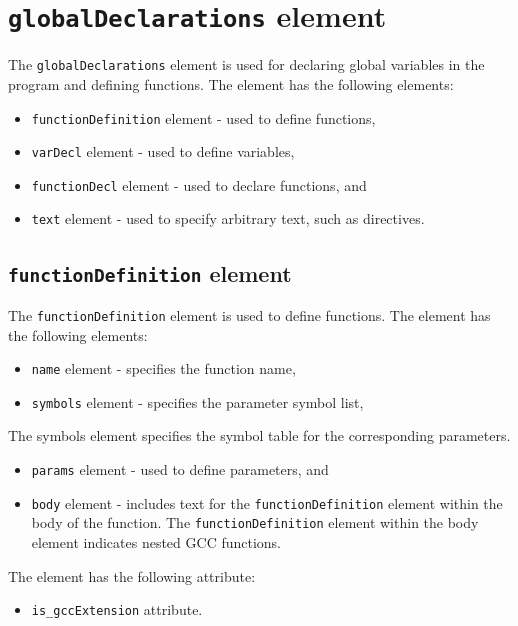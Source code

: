 \section{ {\tt globalDeclarations} element}

The {\tt globalDeclarations} element is used for declaring global variables in the program and defining functions. The element has the following elements:

\begin{itemize}
\item {\tt functionDefinition} element - used to define functions,
\item {\tt varDecl} element - used to define variables,
\item {\tt functionDecl} element - used to declare functions, and
\item {\tt text} element - used to specify arbitrary text, such as directives.
\end{itemize}


\subsection{ {\tt functionDefinition} element}

The {\tt functionDefinition} element is used to define functions. 
The element has the following elements:

\begin{itemize}
\item {\tt name} element - specifies the function name,
\item {\tt symbols} element - specifies the parameter symbol list,
\end{itemize}

The symbols element specifies the symbol table for the corresponding parameters.

\begin{itemize}
\item {\tt params} element - used to define parameters, and
\item {\tt body} element - includes text for the {\tt functionDefinition} element within the body of the function. The {\tt functionDefinition} element within the body element indicates nested GCC functions. 
\end{itemize}

The element has the following attribute:

\begin{itemize}
\item {\tt is\_gccExtension} attribute.
\end{itemize}



